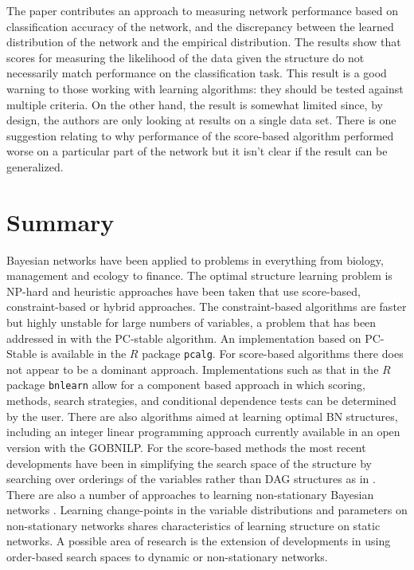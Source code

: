 
        The paper contributes an approach to measuring network
    performance based on classification accuracy of the network, 
    and the discrepancy between the learned distribution of the 
    network and the empirical distribution.
    The results show that scores for measuring the likelihood
    of the data given the structure do not necessarily match
    performance on the classification task. This result is a
    good warning to those working with learning algorithms:
    they should be tested against multiple criteria. On the other hand, 
    the result is somewhat limited since, 
    by design, the authors are only looking at results
    on a single data set. There is one suggestion relating to
    why performance of the score-based algorithm performed 
    worse on a particular part of the network but it isn't 
    clear if the result can be generalized. 
      

    \chapter{Summary}
    
    Bayesian networks have been applied to problems in 
    everything from biology, management and ecology to finance. 
    The optimal structure learning problem is NP-hard and 
    heuristic approaches have been taken that use score-based, 
    constraint-based or hybrid approaches. The constraint-based
    algorithms are
    faster but highly unstable for large numbers of variables, 
    a problem that has been addressed in \cite{Colombo2014} with
    the PC-stable algorithm. An 
    implementation based on PC-Stable is available in the
    $R$ package \texttt{pcalg}.  For
    score-based algorithms there does not appear to be a 
    dominant approach. Implementations such as that 
    in the $R$ package \texttt{bnlearn} allow for a 
    component based approach in which scoring, methods, 
    search strategies, and conditional dependence tests can be 
    determined by the user\cite{Scutari2014}. There are also algorithms
    aimed at learning optimal BN structures, including an
    integer linear programming approach currently available
    in an open version with the GOBNILP. For the score-based methods
    the most recent developments have been in simplifying 
    the search space of the structure by searching over 
    orderings
    of the variables rather than DAG structures as in 
    \cite{NIPS2015_5803}.
    There are also a number of approaches to learning non-stationary
    Bayesian networks \cite{Robinson2010}. Learning 
    change-points in the variable distributions 
     and parameters on non-stationary networks 
    shares characteristics of learning structure on static networks. 
    A possible area of research is the extension of developments
    in using order-based search spaces to dynamic or non-stationary
    networks.  



